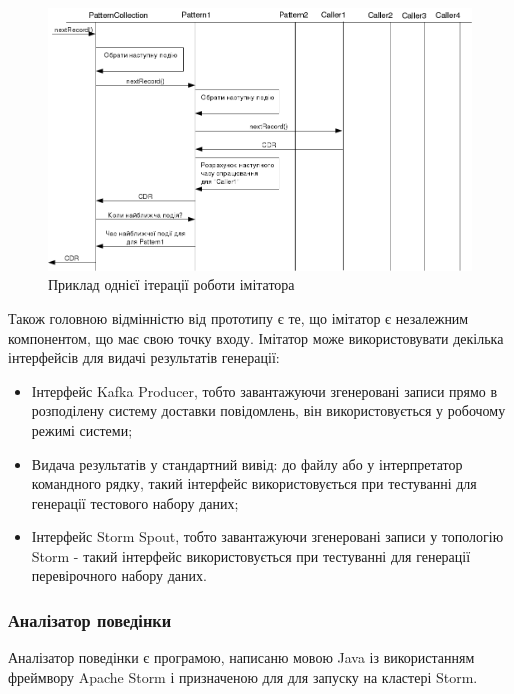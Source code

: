 \begin{figure}[h]
        \begin{center}
            \includegraphics[scale=0.6]{resources/imit-uml.png}
        \end{center}
        \caption{Приклад однієї ітерації роботи імітатора}
        \label{fig:imit-uml-1}
\end{figure}


Також головною відмінністю від прототипу є те, що імітатор є незалежним компонентом, що має свою точку входу. Імітатор може використовувати декілька інтерфейсів для видачі результатів генерації:

\begin{itemize}
  \item Інтерфейс Kafka Producer, тобто завантажуючи згенеровані записи прямо в розподілену систему доставки повідомлень, він використовується у робочому режимі системи;
  \item Видача результатів у стандартний вивід: до файлу або у інтерпретатор командного рядку, такий інтерфейс використовується при тестуванні для генерації тестового набору даних;
  \item Інтерфейс Storm Spout, тобто завантажуючи згенеровані записи у топологію Storm - такий інтерфейс використовується при тестуванні для генерації перевірочного набору даних.
\end{itemize}

\subsubsection{Аналізатор поведінки}

Аналізатор поведінки є програмою, написаню мовою Java із використанням фреймвору Apache Storm і призначеною для для запуску на кластері Storm.

